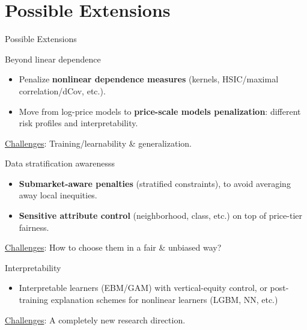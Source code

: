 \documentclass[aspectratio=169,10pt]{beamer}
\begin{document}
\newcommand{\sectionE}{Possible Extensions}
\section{\sectionE}
\begin{frame}{\sectionE}
\vspace{-1.5mm}
\begin{block}{Beyond linear dependence}
\begin{itemize}
  \item Penalize \textbf{nonlinear dependence measures} (kernels, HSIC/maximal correlation/dCov, etc.).
  \item Move from log-price models to \textbf{price-scale models penalization}: different risk profiles and interpretability.
\end{itemize}

 \underline{Challenges}: Training/learnability \& generalization.
\end{block}

\vspace{-1.5mm}

\begin{block}{Data stratification awarenesss}
\begin{itemize}
  \item \textbf{Submarket-aware penalties} (stratified constraints), to avoid averaging away local inequities.
  \item \textbf{Sensitive attribute control} (neighborhood, class, etc.) on top of price-tier fairness.
\end{itemize}
 \underline{Challenges}: How to choose them in a fair \& unbiased way? 
\end{block}

\vspace{-1.5mm}

\begin{block}{Interpretability}
\begin{itemize}
  \item Interpretable learners (EBM/GAM) with vertical-equity control, or post-training explanation schemes for nonlinear learners (LGBM, NN, etc.)
\end{itemize}
 \underline{Challenges}: A completely new research direction.
\end{block}
\end{frame}
\end{document}
